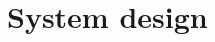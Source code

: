 \section{System design}


\begin{comment}
Draw an UML package diagram for the top level for all components that you have
identified above (which can be just one if you develop a standalone application).
Describe the interfaces and dependencies between the packages. Describe how you
have implemented the MVC design pattern.

Create an UML class diagram for every package. One of the packages will contain
the model of your application. This will be the design model of your
application, describe in detail the relation between your domain model and your
design model. There should be a clear and logical relation between the two. Make
sure that these models stay in `sync' during the development of your application.

Describe which (if any) design patterns you have used.

The above describes the static design of your application. It may sometimes be
necessary to describe the \emph{dynamic} design of your application as well. You
can use an UML \emph{sequence diagram} to show the different parts of your
application communicate an in what order.
\end{comment}
